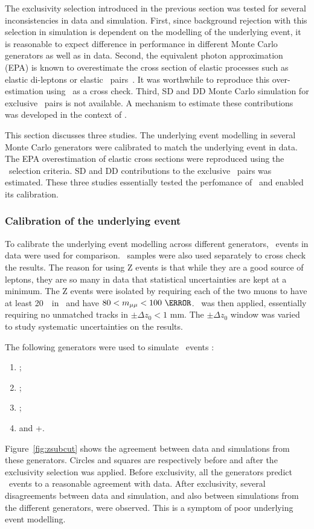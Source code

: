 \par The exclusivity selection introduced in the previous section was tested for several 
inconsistencies in data and simulation. First, since background rejection with this selection in 
simulation is dependent on the modelling of the underlying event, it is reasonable to 
expect difference in performance in different Monte Carlo generators as well as in data. 
Second, the equivalent photon approximation (EPA) is known to overestimate the cross section of 
elastic processes such as elastic di-leptons or elastic \Wpm\ pairs~\cite{Dyndal,Harland-Lang:2015cta}.
It was worthwhile to reproduce this over-estimation using \DZ\ as a cross check.  
Third, SD and DD Monte Carlo simulation for exclusive \Wpm\ pairs is not available. A mechanism to estimate 
these contributions was developed in the context of \DZ. 

\par This section discusses three studies. The underlying event modelling in several 
Monte Carlo generators were calibrated to match the underlying event in data. The EPA 
overestimation of elastic cross sections were reproduced using the \DZ\ selection criteria. 
SD and DD contributions to the exclusive \Wpm\ pairs was estimated. These three studies 
essentially tested the perfomance of \DZ\ and enabled its calibration.  

\subsubsection{Calibration of the underlying event}
\par To calibrate the underlying event modelling across different generators, \Zmm\ events in data 
were used for comparison. \Zee\ samples were also used separately to cross check the results. The reason for 
using Z events is that while they are a good source of leptons, they are so many in data that 
statistical uncertainties are kept at a minimum. The Z events were isolated by requiring each of the two muons 
to have at least 20~\GeV\ in \pt\ and have $80<m_{\mu\mu}<100~\GeV$. \DZ\ was then applied, essentially 
requiring no unmatched tracks in $\pm\Delta z_0<1$ mm. The $\pm\Delta z_0$ window was varied to study 
systematic uncertainties on the results. 

\par The following generators were used to simulate \Zmm\ events :
\begin{enumerate}
\item \AlpgenPythiaSix; 
\item \AlpgenHerwig;
\item \SHERPA;
\item and \POWHEG+\PYTHIAeight.
\end{enumerate} 
Figure~\ref{fig:zsubcut} shows the agreement between data and simulations from these generators. 
Circles and squares are respectively before and after the exclusivity selection was applied. Before 
exclusivity, all the generators predict \Zmm\ events to a reasonable agreement with data. After 
exclusivity, several disagreements between data and simulation, and also between simulations from the 
different generators, were observed. This is a symptom of poor underlying event modelling.  

